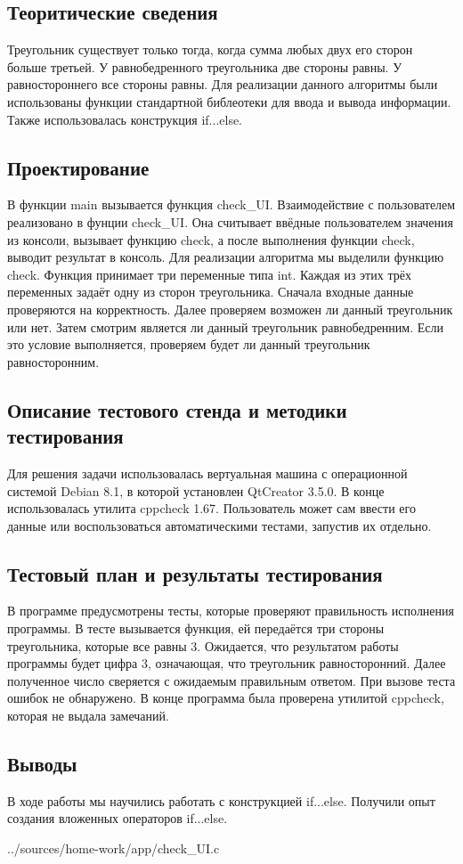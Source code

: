 \documentclass[12pt,a4paper]{report}
\begin{document}
\subsection{Теоритические сведения}
Треугольник существует только тогда, когда сумма любых двух его сторон больше третьей. У равнобедренного треугольника две стороны равны. У равностороннего все стороны равны.
Для реализации данного алгоритмы были использованы функции стандартной библеотеки для ввода и вывода информации. Также использовалась конструкция if...else. 
\subsection{Проектирование}
В функции main вызывается функция check\_UI. Взаимодействие с пользователем реализовано в фунции check\_UI. Она считывает ввёдные пользователем значения из консоли, вызывает функцию check, а после выполнения функции check, выводит результат в консоль. Для реализации алгоритма мы выделили функцию check. Функция принимает три переменные типа int. Каждая из этих трёх переменных задаёт одну из сторон треугольника. Сначала входные данные проверяются на корректность. Далее проверяем возможен ли данный треугольник или нет. Затем смотрим является ли данный треугольник равнобедренним. Если это условие выполняется, проверяем будет ли данный треугольник равносторонним.
\subsection{Описание тестового стенда и методики тестирования}
Для решения задачи использовалась вертуальная машина с операционной системой Debian 8.1, в которой установлен QtCreator 3.5.0. В конце использовалась утилита cppcheck 1.67.
Пользователь может сам ввести его данные или воспользоваться автоматическими тестами, запустив их отдельно.
\subsection{Тестовый план и результаты тестирования}
В программе предусмотрены тесты, которые проверяют правильность исполнения программы. В тесте вызывается функция, ей передаётся три стороны треугольника, которые все равны 3. Ожидается, что результатом работы программы будет цифра 3, означающая, что треугольник равносторонний. Далее полученное число сверяется с ожидаемым правильным ответом. При вызове теста ошибок не обнаружено. В конце программа была проверена утилитой cppcheck, которая не выдала замечаний.
\subsection{Выводы}
В ходе работы мы научились работать с конструкцией if...else. Получили опыт создания вложенных операторов if...else.

{../sources/home-work/app/check_UI.c}
\end{document}
